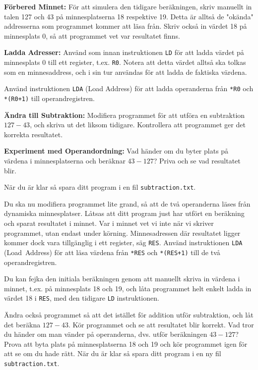 \begin{Datorarbete}
    \begin{Deluppgifter}
        \item \textbf{Förbered Minnet:} För att simulera den tidigare beräkningen, skriv manuellt in talen 127 och 43 på minnesplatserna 18 respektive 19. Detta är alltså de "okända" addresserna som programmet kommer att läsa från. Skriv också in värdet 18 på minnesplats 0, så att programmet vet var resultatet finns.
        \item \textbf{Ladda Adresser:} Använd som innan instruktionen \texttt{LD} för att ladda värdet på minnesplats 0 till ett register, t.ex. \texttt{R0}. Notera att detta värdet alltså ska tolkas som en minnesaddress, och i sin tur användas för att ladda de faktiska värdena.
        \item Använd instruktionen \texttt{LDA} (Load Address) för att ladda operanderna från \texttt{*R0} och \texttt{*(R0+1)} till operandregistren.
        \item \textbf{Ändra till Subtraktion:} Modifiera programmet för att utföra en subtraktion \(127-43\), och skriva ut det liksom tidigare. Kontrollera att programmet ger det korrekta resultatet.
        \item \textbf{Experiment med Operandordning:} Vad händer om du byter plats på värdena i minnesplatserna och beräknar \(43-127\)? Priva och se vad resultatet blir.
    \end{Deluppgifter}

    När du är klar så spara ditt program i en fil \texttt{subtraction.txt}.


    \item Du ska nu modifiera programmet lite grand, så att de två operanderna läses från dynamiska minnesplatser. Låtsas att ditt program just har utfört en beräkning och sparat resultatet i minnet. Var i minnet vet vi inte när vi skriver programmet, utan endast under körning. Minnesadressen där resultatet ligger kommer dock vara tillgänglig i ett register, säg \texttt{RES}. Använd instruktionen \texttt{LDA} (Load~Address) för att läsa värdena från \texttt{*RES} och \texttt{*(RES+1)} till de två operandregistren.
    
    Du kan fejka den initiala beräkningen genom att manuellt skriva in värdena i minnet, t.ex. på minnesplats 18 och 19, och låta programmet helt enkelt ladda in värdet 18 i \texttt{RES}, med den tidigare \texttt{LD} instruktionen.

    Ändra också programmet så att det istället för addition utför subtraktion, och låt det beräkna \(127-43\). Kör programmet och se att resultatet blir korrekt.
    Vad tror du händer om man vänder på operanderna, dvs. utför beräkningen \(43-127\)? Prova att byta plats på minnesplatserna 18 och 19 och kör programmet igen för att se om du hade rätt. När du är klar så spara ditt program i en ny fil \texttt{subtraction.txt}.


\end{Datorarbete}
